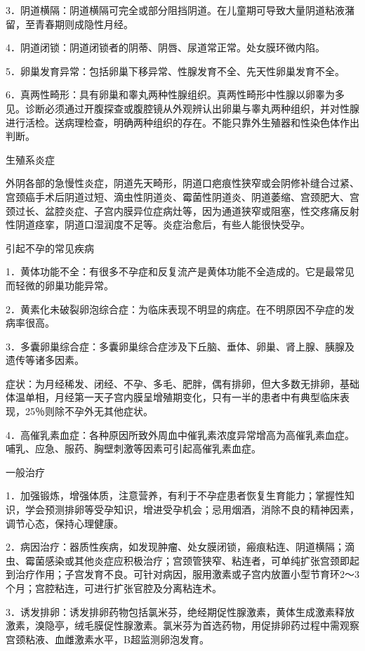 \documentclass[12pt,UTF8,openany]{ctexbook}
\begin{document}
3．阴道横隔：阴道横隔可完全或部分阻挡阴道。在儿童期可导致大量阴道粘液潴留，至青春期则成隐性月经。

4．阴道闭锁：阴道闭锁者的阴蒂、阴唇、尿道常正常。处女膜环微内陷。

5．卵巢发育异常：包括卵巢下移异常、性腺发育不全、先天性卵巢发育不全。

6．真两性畸形：具有卵巢和睾丸两种性腺组织。真两性畸形中性腺以卵睾为多见。诊断必须通过开腹探查或腹腔镜从外观辨认出卵巢与睾丸两种组织，并对性腺进行活检。送病理检查，明确两种组织的存在。不能只靠外生殖器和性染色体作出判断。

生殖系炎症

外阴各部的急慢性炎症，阴道先天畸形，阴道口疤痕性狭窄或会阴修补缝合过紧、宫颈癌手术后阴道过短、滴虫性阴道炎、霉菌性阴道炎、阴道萎缩、宫颈肥大、宫颈过长、盆腔炎症、子宫内膜异位症病灶等，因为通道狭窄或阻塞，性交疼痛反射性阴道痉挛，阴道口湿润度不足等。炎症治愈后，有些人能很快受孕。

引起不孕的常见疾病

1．黄体功能不全：有很多不孕症和反复流产是黄体功能不全造成的。它是最常见而轻微的卵巢功能异常。

2．黄素化未破裂卵泡综合症：为临床表现不明显的病症。在不明原因不孕症的发病率很高。

3．多囊卵巢综合症：多囊卵巢综合症涉及下丘脑、垂体、卵巢、肾上腺、胰腺及遗传等诸多因素。

症状：为月经稀发、闭经、不孕、多毛、肥胖，偶有排卵，但大多数无排卵，基础体温单相，月经第一天子宫内膜呈增殖期变化，只有一半的患者中有典型临床表现，25％则除不孕外无其他症状。

4．高催乳素血症：各种原因所致外周血中催乳素浓度异常增高为高催乳素血症。哺乳、应急、服药、胸壁刺激等因素可引起高催乳素血症。

一般治疗

1．加强锻炼，增强体质，注意营养，有利于不孕症患者恢复生育能力；掌握性知识，学会预测排卵等受孕知识，增进受孕机会；忌用烟酒，消除不良的精神因素，调节心态，保持心理健康。

2．病因治疗：器质性疾病，如发现肿瘤、处女膜闭锁，瘢痕粘连、阴道横隔；滴虫、霉菌感染或其他炎症应积极治疗；宫颈管狭窄、粘连者，可单纯扩张宫颈即起到治疗作用；子宫发育不良。可针对病因，服用激素或子宫内放置小型节育环2～3个月；宫腔粘连，可进行扩张官腔及分离粘连术。

3．诱发排卵：诱发排卵药物包括氯米芬，绝经期促性腺激素，黄体生成激素释放激素，溴隐亭，绒毛膜促性腺激素。氯米芬为首选药物，用促排卵药过程中需观察宫颈粘液、血雌激素水平，B超监测卵泡发育。
\end{document}
